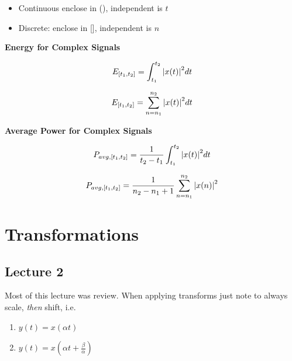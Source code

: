 \documentclass[10pt]{article}
\begin{document}

\begin{itemize}
	\item Continuous enclose in (), independent is $ t $ 
	\item Discrete: enclose in [], independent is $ n $ 
\end{itemize}



\begin{theorem}
	\textbf{Energy for Complex Signals} 

	\begin{equation}
		E_{[t_1, t_2]} = \int_{t_1}^{t_2} \abs{x(t)}^2 dt
		\label{eq:355:energy_CT}
	\end{equation}

	\begin{equation}
		E_{[t_1, t_2]} = \sum_{n=n_1}^{n_2} \abs{x(t)}^2 dt
		\label{eq:355:energy_DT}
	\end{equation}

	\textbf{Average Power for Complex Signals} 

	\begin{equation}
		P_{avg, [t_1, t_2]} = \frac{1}{t_2 - t_1} \int_{t_1}^{t_2} \abs{x(t)}^2 dt
		\label{eq:355:power_avg_CT}
	\end{equation}

	\begin{equation}
		P_{avg, [t_1, t_2]} = \frac{1}{n_2 - n_1 + 1} \sum_{n=n_1}^{n_2} \abs{x(n)}^2
		\label{eq:355:power_avg_DT}
	\end{equation}
		
\end{theorem}


\section{Transformations}

\subsection{Lecture 2}
Most of this lecture was review. When applying transforms just note to always scale, \textit{then} shift, i.e.

\begin{enumerate}
	\item $ y(t) = x(\alpha t) $ 
	\item $ y(t) = x(\alpha t+\frac{\beta}{\alpha}) $ 
\end{enumerate}
\end{document}

